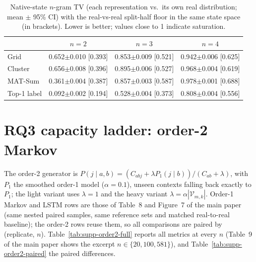 \begin{table}[!t]
\caption{Native-state $n$-gram TV (each representation vs.\ its own real distribution; mean $\pm$ 95\% CI) with the real-vs-real split-half floor in the same state space (in brackets). Lower is better; values close to 1 indicate saturation.}
\label{tab:supp-ngram-native}
\centering\small
\begin{tabular}{lccc}
\toprule
 & $n{=}2$ & $n{=}3$ & $n{=}4$ \\
\midrule
Grid & 0.652$\pm$0.010 [0.393] & 0.853$\pm$0.009 [0.521] & 0.942$\pm$0.006 [0.625] \\
Cluster & 0.656$\pm$0.008 [0.396] & 0.895$\pm$0.006 [0.527] & 0.968$\pm$0.004 [0.619] \\
MAT-Sum & 0.361$\pm$0.004 [0.387] & 0.857$\pm$0.003 [0.587] & 0.978$\pm$0.001 [0.688] \\
Top-1 label & 0.092$\pm$0.002 [0.194] & 0.528$\pm$0.004 [0.373] & 0.808$\pm$0.004 [0.556] \\
\bottomrule
\end{tabular}
\end{table}

\section{RQ3 capacity ladder: order-2 Markov}
\label{supp:order2}
The order-2 generator is $P(j\mid a,b)=(C_{abj}+\lambda P_1(j\mid b))/(C_{ab}+\lambda)$, with $P_1$ the smoothed order-1 model ($\alpha{=}0.1$), unseen contexts falling back exactly to $P_1$; the light variant uses $\lambda{=}1$ and the heavy variant $\lambda{=}\alpha|\mathcal{V}_{m,k}|$. Order-1 Markov and LSTM rows are those of Table~8 and Figure~7 of the main paper (same nested paired samples, same reference sets and matched real-to-real baseline); the order-2 rows reuse them, so all comparisons are paired by (replicate, $n$). Table~\ref{tab:supp-order2-full} reports all metrics at every $n$ (Table~9 of the main paper shows the excerpt $n\in\{20,100,581\}$), and Table~\ref{tab:supp-order2-paired} the paired differences.

